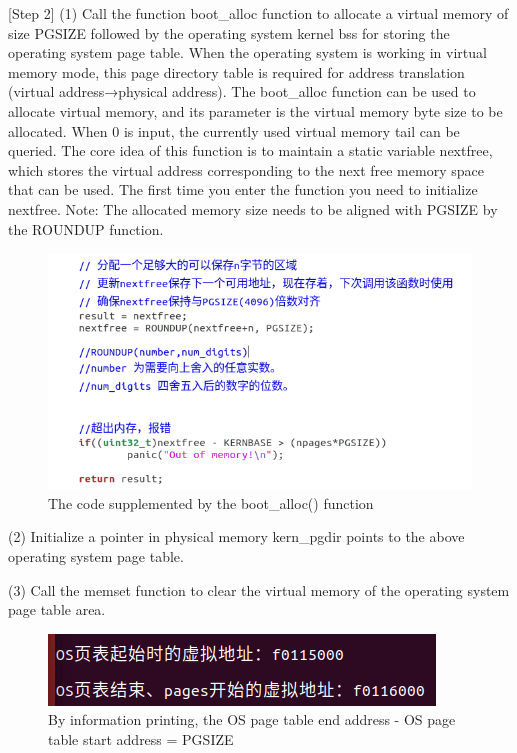 [Step 2] (1) Call the function boot\_alloc function to allocate a virtual memory of size PGSIZE followed by the operating system kernel bss for storing the operating system page table. When the operating system is working in virtual memory mode, this page directory table is required for address translation (virtual address→physical address).
The boot\_alloc function can be used to allocate virtual memory, and its parameter is the virtual memory byte size to be allocated. When 0 is input, the currently used virtual memory tail can be queried. The core idea of ​​this function is to maintain a static variable nextfree, which stores the virtual address corresponding to the next free memory space that can be used. The first time you enter the function you need to initialize nextfree. Note: The allocated memory size needs to be aligned with PGSIZE by the ROUNDUP function.

\begin{figure}[H]
\centering
\includegraphics[width=0.8\linewidth]{figure/boot_alloc_changed}
\caption{The code supplemented by the boot\_alloc() function}
\end{figure}

(2) Initialize a pointer in physical memory kern\_pgdir points to the above operating system page table.

(3) Call the memset function to clear the virtual memory of the operating system page table area.

\begin{figure}[H]
\centering
\includegraphics[width=0.8\linewidth]{figure/PGSIZE}
\caption{By information printing, the OS page table end address - OS page table start address = PGSIZE}
\end{figure}


